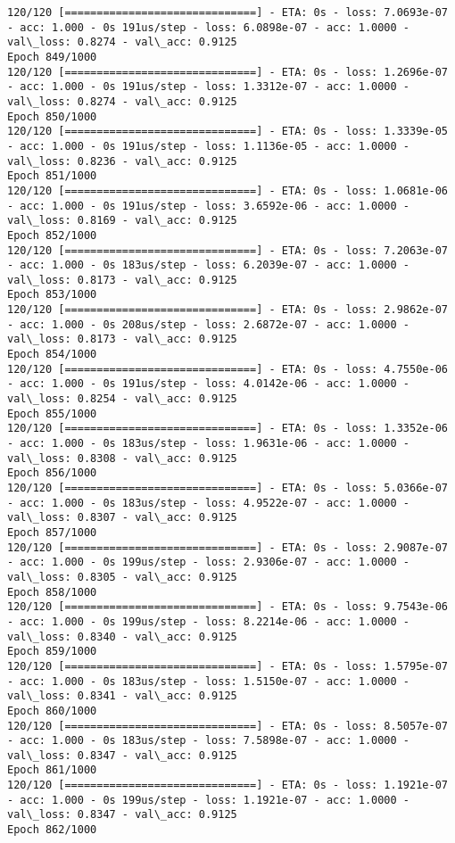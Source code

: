 \documentclass[11pt]{article}
\begin{document}
\begin{Verbatim}[commandchars=\\\{\}]
120/120 [==============================] - ETA: 0s - loss: 7.0693e-07 - acc: 1.000 - 0s 191us/step - loss: 6.0898e-07 - acc: 1.0000 - val\_loss: 0.8274 - val\_acc: 0.9125
Epoch 849/1000
120/120 [==============================] - ETA: 0s - loss: 1.2696e-07 - acc: 1.000 - 0s 191us/step - loss: 1.3312e-07 - acc: 1.0000 - val\_loss: 0.8274 - val\_acc: 0.9125
Epoch 850/1000
120/120 [==============================] - ETA: 0s - loss: 1.3339e-05 - acc: 1.000 - 0s 191us/step - loss: 1.1136e-05 - acc: 1.0000 - val\_loss: 0.8236 - val\_acc: 0.9125
Epoch 851/1000
120/120 [==============================] - ETA: 0s - loss: 1.0681e-06 - acc: 1.000 - 0s 191us/step - loss: 3.6592e-06 - acc: 1.0000 - val\_loss: 0.8169 - val\_acc: 0.9125
Epoch 852/1000
120/120 [==============================] - ETA: 0s - loss: 7.2063e-07 - acc: 1.000 - 0s 183us/step - loss: 6.2039e-07 - acc: 1.0000 - val\_loss: 0.8173 - val\_acc: 0.9125
Epoch 853/1000
120/120 [==============================] - ETA: 0s - loss: 2.9862e-07 - acc: 1.000 - 0s 208us/step - loss: 2.6872e-07 - acc: 1.0000 - val\_loss: 0.8173 - val\_acc: 0.9125
Epoch 854/1000
120/120 [==============================] - ETA: 0s - loss: 4.7550e-06 - acc: 1.000 - 0s 191us/step - loss: 4.0142e-06 - acc: 1.0000 - val\_loss: 0.8254 - val\_acc: 0.9125
Epoch 855/1000
120/120 [==============================] - ETA: 0s - loss: 1.3352e-06 - acc: 1.000 - 0s 183us/step - loss: 1.9631e-06 - acc: 1.0000 - val\_loss: 0.8308 - val\_acc: 0.9125
Epoch 856/1000
120/120 [==============================] - ETA: 0s - loss: 5.0366e-07 - acc: 1.000 - 0s 183us/step - loss: 4.9522e-07 - acc: 1.0000 - val\_loss: 0.8307 - val\_acc: 0.9125
Epoch 857/1000
120/120 [==============================] - ETA: 0s - loss: 2.9087e-07 - acc: 1.000 - 0s 199us/step - loss: 2.9306e-07 - acc: 1.0000 - val\_loss: 0.8305 - val\_acc: 0.9125
Epoch 858/1000
120/120 [==============================] - ETA: 0s - loss: 9.7543e-06 - acc: 1.000 - 0s 199us/step - loss: 8.2214e-06 - acc: 1.0000 - val\_loss: 0.8340 - val\_acc: 0.9125
Epoch 859/1000
120/120 [==============================] - ETA: 0s - loss: 1.5795e-07 - acc: 1.000 - 0s 183us/step - loss: 1.5150e-07 - acc: 1.0000 - val\_loss: 0.8341 - val\_acc: 0.9125
Epoch 860/1000
120/120 [==============================] - ETA: 0s - loss: 8.5057e-07 - acc: 1.000 - 0s 183us/step - loss: 7.5898e-07 - acc: 1.0000 - val\_loss: 0.8347 - val\_acc: 0.9125
Epoch 861/1000
120/120 [==============================] - ETA: 0s - loss: 1.1921e-07 - acc: 1.000 - 0s 199us/step - loss: 1.1921e-07 - acc: 1.0000 - val\_loss: 0.8347 - val\_acc: 0.9125
Epoch 862/1000

\end{Verbatim}
\end{document}

